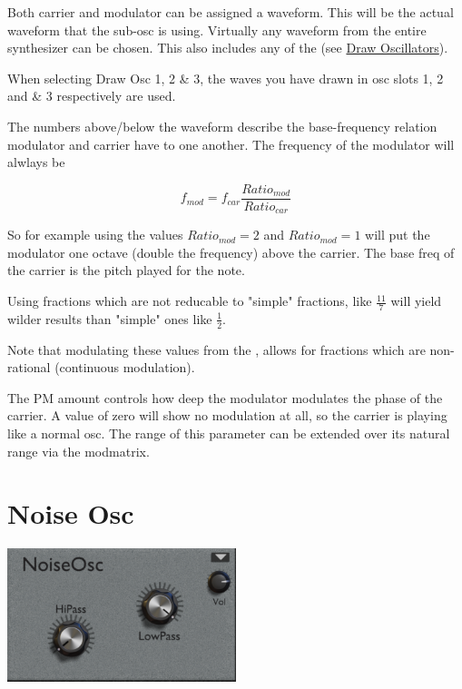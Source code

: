 {Both carrier and modulator can be assigned a waveform. This will be the actual waveform that the sub-osc is using. Virtually any waveform from the entire synthesizer can be chosen. This also includes any of the (see \hyperref[wavedraw]{Draw Oscillators}).

When selecting  Draw Osc 1, 2 \& 3, the waves you have drawn in osc slots 1, 2 and \& 3 respectively are used.}

{The numbers above/below the waveform describe the base-frequency relation modulator and carrier have to one another. The frequency of the modulator will alwlays be

\begin{equation}
    f_{mod} = f_{car} \frac{Ratio_{mod}}{Ratio_{car}}
\end{equation}

So for example using the values $Ratio_{mod} = 2$ and $Ratio_{mod} = 1$ will put the modulator one octave (double the frequency) above the carrier. The base freq of the carrier is the pitch played for the note.

Using fractions which are not reducable to "simple" fractions, like $\frac{11}{7}$ will yield wilder results than "simple" ones like $\frac{1}{2}$.

Note that modulating these values from the \modmatrix, allows for fractions which are non-rational (continuous modulation).}

{The PM amount controls how deep the modulator modulates the phase of the carrier. A value of zero will show no modulation at all, so the carrier is playing like a normal osc. The range of this parameter can be extended over its natural range via the modmatrix.}

\section{Noise Osc}
\begin{center}
    \includegraphics[width=0.5\textwidth]{graphics/noise_osc.png}
\end{center}

